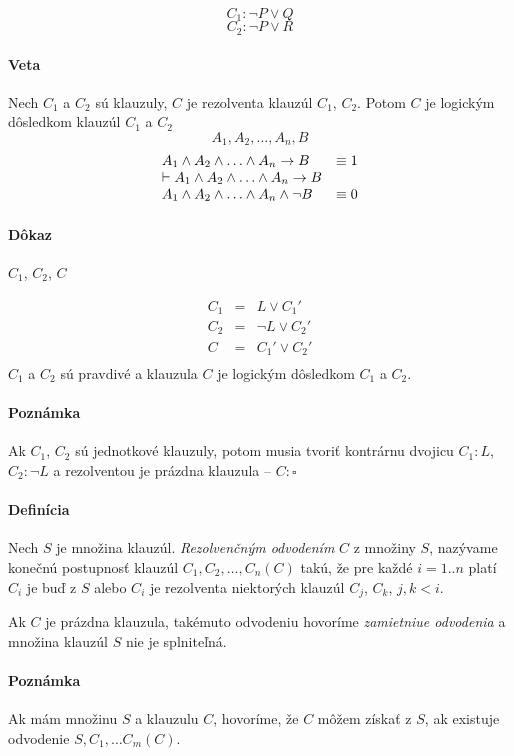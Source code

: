$$C_1: \neg P \lor Q$$
$$C_2: \neg P \lor R$$

\paragraph{Veta} Nech $C_1$ a $C_2$ sú klauzuly, $C$ je rezolventa klauzúl
$C_1$, $C_2$. Potom $C$ je logickým dôsledkom klauzúl $C_1$ a $C_2$
$$A_1, A_2, \ldots, A_n, B$$
$$
\begin{array}{ll}
A_1 \land A_2 \land \ldots \land A_n \rightarrow B & \equiv 1	\\
\vdash A_1 \land A_2 \land \ldots \land A_n \rightarrow B & \\
A_1 \land A_2 \land \ldots \land A_n \land \neg B & \equiv 0	\\
\end{array}
$$
\paragraph{Dôkaz} $C_1$, $C_2$, $C$


$$
\begin{array}{lll}
C_1 &= &L \lor C_1' \\
C_2 &=& \neg L \lor C_2' \\
C   &=& C_1' \lor C_2'	\\
\end{array}
$$
$C_1$ a $C_2$ sú pravdivé a klauzula $C$ je logickým dôsledkom $C_1$ a $C_2$.

\paragraph{Poznámka} Ak $C_1$, $C_2$ sú jednotkové klauzuly, potom musia tvoriť
kontrárnu dvojicu $C_1: L$, $C_2: \neg L$ a rezolventou je prázdna klauzula --
$C: \square$


\paragraph{Definícia} Nech $S$ je množina klauzúl.
\emph{Rezolvenčným odvodením} $C$ z množiny $S$, nazývame konečnú
postupnosť klauzúl $C_1, C_2, \ldots, C_n (C)$ takú, že pre každé $i=1..n$ platí
$C_i$ je buď z $S$ alebo $C_i$ je rezolventa niektorých klauzúl $C_j$, $C_k$,
$j, k < i$.

\par Ak $C$ je prázdna klauzula, takémuto odvodeniu hovoríme \emph{zamietniue
odvodenia} a množina klauzúl $S$ nie je splniteľná.

\paragraph{Poznámka} Ak mám množinu $S$ a klauzulu $C$, hovoríme, že $C$ môžem
získať z $S$, ak existuje odvodenie $S, C_1, \ldots C_m (C)$.

